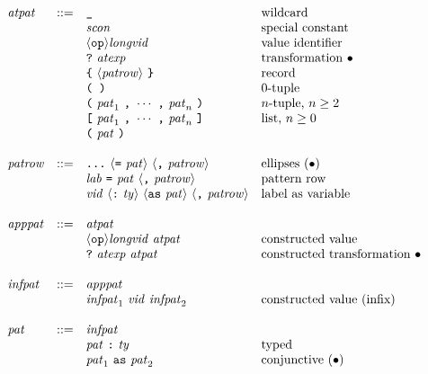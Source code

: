 \documentclass[twoside,titlepage]{article}
\begin{document}
\begin{appendix}
  $$
  \begin{array}{llll}
  \mathit{atpat} & ::= & \mbox{\tt\_} & \textrm{wildcard} \\
  && \mathit{scon} & \textrm{special constant} \\
  && \langle{\tt{op}}\rangle\mathit{longvid} & \textrm{value identifier} \\
  && \mbox{\tt?}~\mathit{atexp} & \textrm{transformation $\bullet$} \\
  && \mbox{\tt\{}~\langle\mathit{patrow}\rangle~\mbox{\tt\}} & \textrm{record} \\
  && \mbox{\tt( )} & \textrm{$0$-tuple} \\
  && \mbox{\tt(}~\mathit{pat}_1~\mbox{\tt,}~\cdots~\mbox{\tt,}~\mathit{pat}_n~\mbox{\tt)} & \textrm{$n$-tuple, $n\geq2$} \\
  && \mbox{\tt[}~\mathit{pat}_1~\mbox{\tt,}~\cdots~\mbox{\tt,}~\mathit{pat}_n~\mbox{\tt]} & \textrm{list, $n\geq0$} \\
  && \mbox{\tt(}~\mathit{pat}~\mbox{\tt)} \\
  \\
  \mathit{patrow} & ::= & \mbox{\tt...}~\langle\mbox{\tt=}~\mathit{pat}\rangle~\langle\mbox{\tt,}~\mathit{patrow}\rangle & \textrm{ellipses $(\bullet)$} \\
  && \mathit{lab}~\mbox{\tt=}~\mathit{pat}~\langle\mbox{\tt,}~\mathit{patrow}\rangle & \textrm{pattern row} \\
  && \mathit{vid}~\langle\mbox{\tt:}~\mathit{ty}\rangle~\langle{\tt{as}}~\mathit{pat}\rangle~\langle\mbox{\tt,}~\mathit{patrow}\rangle & \textrm{label as variable} \\
  \\
  \mathit{apppat} & ::= & \mathit{atpat} \\
  && \langle{\tt{op}}\rangle\mathit{longvid}~\mathit{atpat} & \textrm{constructed value} \\
  && \mbox{\tt?}~\mathit{atexp}~\mathit{atpat} & \textrm{constructed transformation $\bullet$} \\
  \\
  \mathit{infpat} & ::= & \mathit{apppat} \\
  && \mathit{infpat}_1~\mathit{vid}~\mathit{infpat}_2 & \textrm{constructed value (infix)} \\
  \\
  \mathit{pat} & ::= & \mathit{infpat} \\
  && \mathit{pat}~\mbox{\tt:}~\mathit{ty} & \textrm{typed} \\
  && \mathit{pat}_1~{\tt{as}}~\mathit{pat}_2 & \textrm{conjunctive $(\bullet)$} \\

\end{array}$$
\end{appendix}
\end{document}
